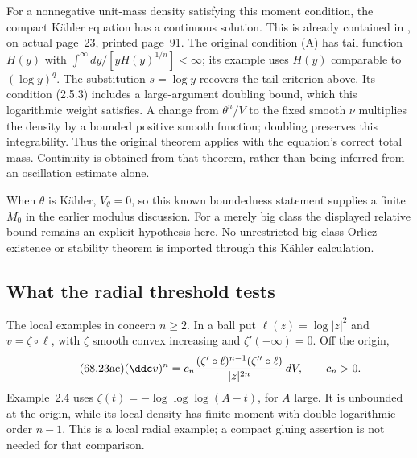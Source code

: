 For a nonnegative unit-mass density satisfying this moment condition,
the compact K\"ahler equation has a continuous solution. This is already
contained in \cite[Theorem~2.5.2 and Example~1]{Kol98}, on actual
page~23, printed page~91. The original condition (A) has tail function
$H(y)$ with $\int^{\infty}dy/[yH(y)^{1/n}]<\infty$; its example uses
$H(y)$ comparable to $(\log y)^q$. The substitution $s=\log y$
recovers the tail criterion above. Its condition (2.5.3) includes a
large-argument doubling bound, which this logarithmic weight satisfies.
A change from $\theta^n/V$ to the fixed smooth $\nu$ multiplies the
density by a bounded positive smooth function; doubling preserves this
integrability. Thus the original theorem applies with the equation's
correct total mass. Continuity is obtained from that theorem, rather than
being inferred from an oscillation estimate alone.

When $\theta$ is K\"ahler, $V_\theta=0$, so this known boundedness
statement supplies a finite $M_0$ in the earlier modulus discussion.
For a merely big class the displayed relative bound remains an explicit
hypothesis here. No unrestricted big-class Orlicz existence or stability
theorem is imported through this K\"ahler calculation.

\subsection{What the radial threshold tests}
\label{sec:ytd-orlicz-radial}

The local examples in \cite[Section~2.2]{GuedjLu25FromYauV2} concern
$n\geq2$. In a ball put $\ell(z)=\log|z|^2$ and
$v=\zeta\circ\ell$, with $\zeta$ smooth convex increasing and
$\zeta'(-\infty)=0$. Off the origin,
\[
\tag{68.23ac}\label{eq:ytd-orlicz-radial-density}
 (\ddc v)^n
   =c_n\frac{(\zeta'\circ\ell)^{n-1}
                    (\zeta''\circ\ell)}{|z|^{2n}}\,dV,
 \qquad c_n>0.
\]
Example~2.4 uses $\zeta(t)=-\log\log\log(A-t)$, for $A$ large.
It is unbounded at the origin, while its local density has finite
moment with double-logarithmic order $n-1$. This is a local radial
example; a compact gluing assertion is not needed for that comparison.

